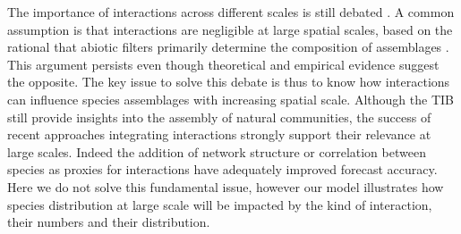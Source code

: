 The importance of interactions across different scales is still debated \citep{McGill2010,Araujo2014}. A common assumption is that interactions are negligible at large spatial scales, based on the rational that abiotic filters primarily determine the composition of assemblages \citep{Pearson2003}. This argument persists even though theoretical \citep{Gravel2011} and empirical \citep{Gotelli2010} evidence suggest the opposite. The key issue to solve this debate is thus to know how interactions can influence species assemblages with increasing spatial scale. Although the TIB still provide insights into the assembly of natural communities, the success of recent approaches integrating interactions strongly support their relevance at large scales. Indeed the addition of network structure \citep{Pellissier2013} or correlation between species \citep{Pollock2014} as proxies for interactions have adequately improved forecast accuracy. Here we do not solve this fundamental issue, however our model illustrates how species distribution at large scale will be impacted by the kind of interaction, their numbers and their distribution.

